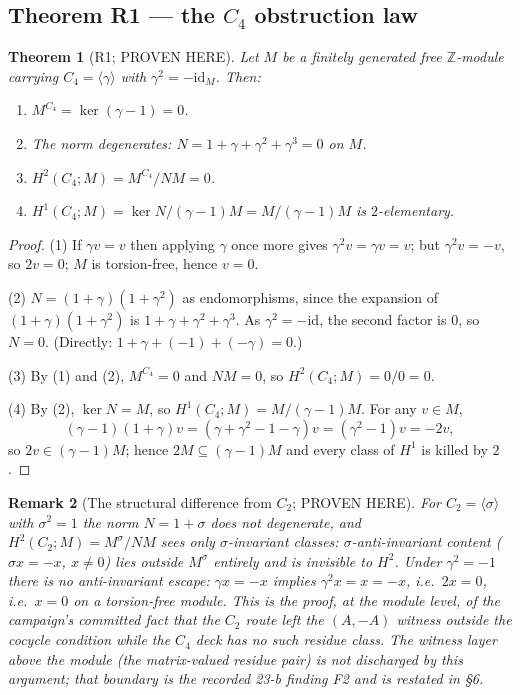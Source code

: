 \documentclass[11pt]{article}
\newtheorem{theorem}{Theorem}
\newtheorem{remark}[theorem]{Remark}
\newcommand{\Z}{\mathbb Z}
\begin{document}
\subsection{Theorem R1 --- the $C_4$ obstruction law}

\begin{theorem}[R1; PROVEN HERE]
Let $M$ be a finitely generated free $\Z$-module carrying
$C_4=\langle\gamma\rangle$ with $\gamma^2=-\mathrm{id}_M$. Then:
\begin{enumerate}
\item $M^{C_4}=\ker(\gamma-1)=0$.
\item The norm degenerates: $N=1+\gamma+\gamma^2+\gamma^3=0$ on $M$.
\item $H^2(C_4;M)=M^{C_4}/NM=0$.
\item $H^1(C_4;M)=\ker N/(\gamma-1)M=M/(\gamma-1)M$ is $2$-elementary.
\end{enumerate}
\end{theorem}

\begin{proof}
(1) If $\gamma v=v$ then applying $\gamma$ once more gives
$\gamma^2v=\gamma v=v$; but $\gamma^2v=-v$, so $2v=0$; $M$ is torsion-free,
hence $v=0$.

(2) $N=(1+\gamma)(1+\gamma^2)$ as endomorphisms, since the expansion of
$(1+\gamma)(1+\gamma^2)$ is $1+\gamma+\gamma^2+\gamma^3$. As
$\gamma^2=-\mathrm{id}$, the second factor is $0$, so $N=0$. (Directly:
$1+\gamma+(-1)+(-\gamma)=0$.)

(3) By (1) and (2), $M^{C_4}=0$ and $NM=0$, so
$H^2(C_4;M)=0/0=0$.

(4) By (2), $\ker N=M$, so $H^1(C_4;M)=M/(\gamma-1)M$. For any
$v\in M$,
\[
(\gamma-1)(1+\gamma)v=(\gamma+\gamma^2-1-\gamma)v=(\gamma^2-1)v=-2v,
\]
so $2v\in(\gamma-1)M$; hence $2M\subseteq(\gamma-1)M$ and every class of
$H^1$ is killed by $2$.
\end{proof}

\begin{remark}[The structural difference from $C_2$; PROVEN HERE]
For $C_2=\langle\sigma\rangle$ with $\sigma^2=1$ the norm
$N=1+\sigma$ does not degenerate, and
$H^2(C_2;M)=M^{\sigma}/NM$ sees only $\sigma$-invariant classes:
$\sigma$-anti-invariant content ($\sigma x=-x$, $x\ne0$) lies outside
$M^{\sigma}$ entirely and is invisible to $H^2$. Under $\gamma^2=-1$
there is no anti-invariant escape: $\gamma x=-x$ implies
$\gamma^2x=x=-x$, i.e.\ $2x=0$, i.e.\ $x=0$ on a torsion-free module.
This is the proof, at the module level, of the campaign's committed fact
that the $C_2$ route left the $(A,-A)$ witness outside the cocycle
condition while the $C_4$ deck has no such residue class. The witness
\emph{layer} above the module (the matrix-valued residue pair) is not
discharged by this argument; that boundary is the recorded 23-b finding
F2 and is restated in \S6.
\end{remark}
\end{document}
